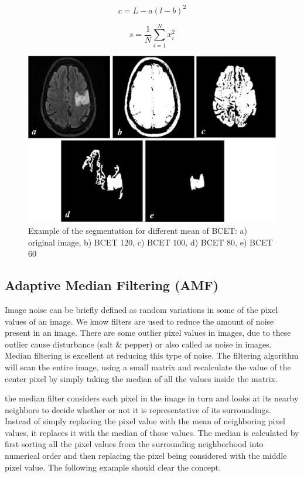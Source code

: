 \begin{equation}
	c = L-a(l-b)^2 
\end{equation}

\begin{equation}
	s = \frac{1}{N}\sum_{i=1}^{N}x_i^2
\end{equation}

\begin{figure}[H]
	\centering \includegraphics[width=0.8\columnwidth]{figures/Fig28.png}
	\caption{Example of the segmentation for different mean of BCET: a) original image, b) BCET 120, c) BCET 100, d) BCET 80, e) BCET 60}
	\label{fig28}
\end{figure}

\subsection{Adaptive Median Filtering (AMF)}
Image noise can be briefly defined as random variations in some of the pixel values of an image. We know filters are used to reduce the amount of noise present in an image. There are some outlier pixel values in images, due to these outlier cause disturbance (salt \& pepper) or also called as noise in images. Median filtering is excellent at reducing this type of noise. The filtering algorithm will scan the entire image, using a small matrix and recalculate the value of the center pixel by simply taking the median of all the values inside the matrix.

the median filter considers each pixel in the image in
turn and looks at its nearby neighbors to decide whether or not it is representative of its surroundings. Instead of simply replacing the pixel value with the mean of neighboring pixel values, it replaces it with the median of those values. The median is calculated by first sorting all the pixel values from the surrounding neighborhood into numerical order and then replacing the pixel being considered with the middle pixel value. The following example should clear the concept.

